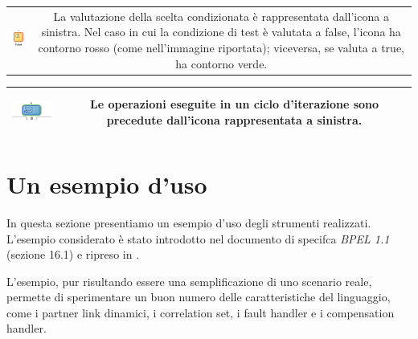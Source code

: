 \begin{tabular}{c c}
\hline
\parbox[c][3.5cm][c]{0.2 \textwidth}{
\begin{center} 
\includegraphics[scale=0.7]{blide/dia/BlideIf}
\end{center}
} & 
\parbox[c][3.5cm][c]{0.6 \textwidth}{La valutazione della scelta condizionata
è rappresentata dall'icona a sinistra. Nel caso in cui la condizione di test
è valutata a false, l'icona ha contorno rosso (come nell'immagine
riportata); viceversa, se valuta a true, ha contorno verde.}\\
\end{tabular}

\begin{tabular}{c c}
\hline
\parbox[c][2.5cm][c]{0.2 \textwidth}{
\begin{center} 
\includegraphics[scale=0.7]{blide/dia/BlideWhile}
\end{center}
} & 
\parbox[c][2.5cm][c]{0.6 \textwidth}{Le operazioni eseguite in un ciclo
d'iterazione sono precedute dall'icona rappresentata a sinistra.}\\
\hline
\end{tabular}


\vspace{0.5cm}
\section{Un esempio d'uso}

In questa sezione presentiamo un esempio d'uso degli strumenti
realizzati. L'esempio considerato è stato introdotto nel documento di specifca
\emph{BPEL 1.1} \cite{BPEL11Spec} (sezione 16.1) e ripreso in
\cite{LaPuTie1}.

L'esempio, pur risultando essere una semplificazione di uno scenario reale,
permette di sperimentare un buon numero delle caratteristiche del linguaggio,	
come i partner link dinamici, i correlation set, i fault handler e i
compensation handler.
\\

